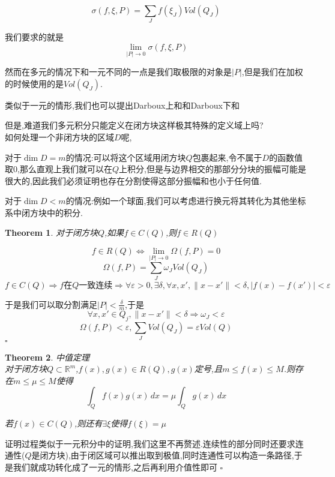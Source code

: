 \documentclass[11pt,hyperref,a4paper,UTF8]{ctexart}
\newtheorem{theorem}{Theorem}[subsection]
\newenvironment{cproof}{%
\heiti{证明}\kaishu
}{%
  \hfill $\square$
  \par\bigskip
}
\newcommand{\RR}{\mathbb{R}}
\begin{document}
\begin{CJK}{UTF8}{gkai}
\[\sigma(f,\xi,P) = \sum_{J} f(\xi_J) Vol(Q_J)\]

我们要求的就是
\[\lim_{|P| \to 0} \sigma(f,\xi,P)\]

然而在多元的情况下和一元不同的一点是我们取极限的对象是$|P|$,但是我们在加权的时候使用的是$Vol(Q_J)$.

类似于一元的情形,我们也可以提出Darboux上和和Darboux下和

但是,难道我们多元积分只能定义在闭方块这样极其特殊的定义域上吗?\\

如何处理一个非闭方块的区域$D$呢,

对于$\dim D = m$的情况:可以将这个区域用闭方块$Q$包裹起来,令不属于$D$的函数值取$0$,那么直观上我们就可以在$Q$上积分,但是与边界相交的那部分分块的振幅可能是很大的,因此我们必须证明也存在分割使得这部分振幅和也小于任何值.

对于$\dim D < m$的情况:例如一个球面,我们可以考虑进行换元将其转化为其他坐标系中闭方块中的积分.

\begin{theorem}
  对于闭方块$Q$,如果$f\in C(Q)$,则$f \in R(Q)$\\
\end{theorem}

\begin{cproof}
  \[f \in R(Q)\Leftrightarrow \lim_{|P|\to 0} \Omega(f,P) = 0\]
  \[\Omega(f,P) = \sum_{J} \omega_J Vol(Q_J)\]
  \[f \in C(Q) \Rightarrow f\text{在}Q\text{一致连续} \Rightarrow \forall \varepsilon >0,\exists \delta,\forall x,x', \|x - x'\| < \delta, |f(x) - f(x')| < \varepsilon\]

  于是我们可以取分割满足$|P| < \frac{\delta}{m}$,于是
  \[\forall x,x' \in Q_j, \|x - x'\| < \delta \Rightarrow \omega_J < \varepsilon\]
  \[\Omega(f,P) < \varepsilon, \sum_{J} Vol(Q_J) = \varepsilon Vol(Q)\]
\end{cproof}

\begin{theorem}
  中值定理\\

  对于闭方块$Q \subset \RR^m$,$f(x),g(x)\in R(Q), g(x)$定号,且$m \leq f(x) \leq M$.则存在$m \leq \mu \leq M$使得
  \[\int_{Q} f(x)g(x)\, dx = \mu \int_{Q} g(x)\, dx\]

  若$f(x) \in C(Q)$,则还有$\exists \xi$使得$f(\xi) = \mu$
\end{theorem}

\begin{cproof}
  证明过程类似于一元积分中的证明,我们这里不再赘述.连续性的部分同时还要求连通性($Q$是闭方块),由于闭区域可以推出取到极值,同时连通性可以构造一条路径,于是我们就成功转化成了一元的情形,之后再利用介值性即可
\end{cproof}


\end{CJK}
\end{document}
